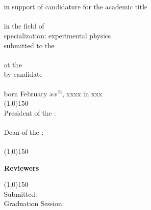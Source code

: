 {\parskip=0pt
\begin{center}
	\vspace*{1cm}
	\textbf{\LARGE \textsf{\METAtitle}\\ \null}
	\textbf{\large\textsf{\METAdoctype}\\\null}
	in support of candidature for the academic title \\\null
	\METAdegree\\\null
	in the field of \METAsubject\\
	specialization: experimental physics \\ \null%
	submitted to the \\
	\METAfaculty \\
	at the \METAuniversity \\ \null
	by candidate\\\null
	\textbf{\METAdegreeold~\METAauthor} \\
	born February $xx^\mathrm{th}$, xxxx in xxx \\ \null %
	\line(1,0){150} \\\null
	President of the \METAuniversity{}: \\
	\METApresident \\ \null
	Dean of the \METAfaculty{}: \\
	\METAdeanf \\
	\line(1,0){150} \\\null
	\begin{flushleft}\textbf{Reviewers}\end{flushleft}
		\begin{flushleft}\hspace*{12mm}\METAsupervisora\dotfill\end{flushleft}
		\begin{flushleft}\hspace*{12mm}\METAsupervisorb\dotfill\end{flushleft}
		\begin{flushleft}\hspace*{12mm}\METAsupervisorc\dotfill\end{flushleft}
	\line(1,0){150}\\ \null
		Submitted: \METAhandin \\
		Graduation Session: \METAgradsession \\
\end{center}}
